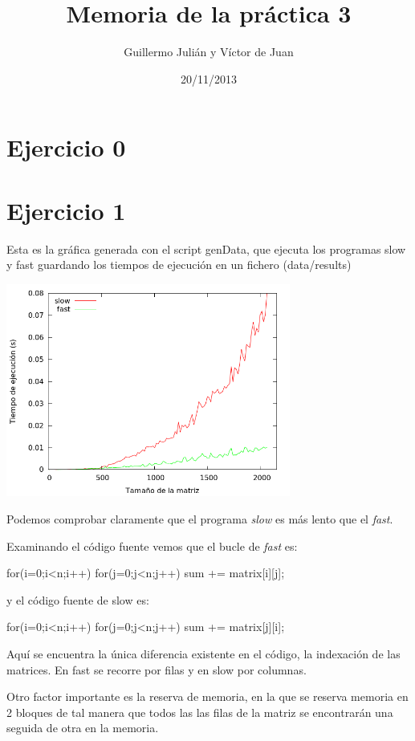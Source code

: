 \documentclass[nochap]{apuntes}
\title{Memoria de la práctica 3}
\author{Guillermo Julián y Víctor de Juan}
\date{20/11/2013}
\begin{document}
\pagestyle{plain}
\maketitle

\tableofcontents


\section{Ejercicio 0}

\section{Ejercicio 1}

Esta es la gráfica generada con el script genData, que ejecuta los programas slow y fast guardando los tiempos de ejecución en un fichero (data/results)

\begin{center}
\includegraphics[width=0.7\textwidth]{graficas/fotos/ejercicio1.png}
\end{center}

Podemos comprobar claramente que el programa \emph{slow} es más lento que el \emph{fast}.

Examinando el código fuente vemos que el bucle de \emph{fast} es:

	for(i=0;i<n;i++)
		for(j=0;j<n;j++)
			sum += matrix[i][j];

y el código fuente de slow es:

	for(i=0;i<n;i++)
		for(j=0;j<n;j++)
			sum += matrix[j][i];

Aquí se encuentra la única diferencia existente en el código, la indexación de las matrices. En fast se recorre por filas y en slow por columnas.

Otro factor importante es la reserva de memoria, en la que se reserva memoria en 2 bloques de tal manera que todos las las filas de la matriz se encontrarán una seguida de otra en la memoria.
\end{document}
